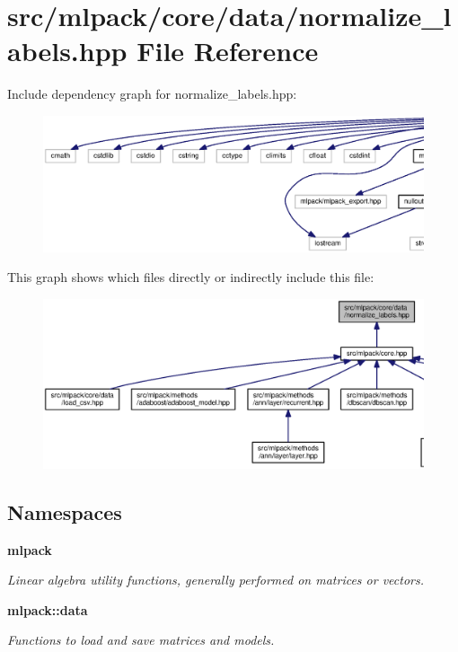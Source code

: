 \section{src/mlpack/core/data/normalize\+\_\+labels.hpp File Reference}
\label{normalize__labels_8hpp}
Include dependency graph for normalize\+\_\+labels.\+hpp\+:
\nopagebreak
\begin{figure}[H]
\begin{center}
\leavevmode
\includegraphics[width=350pt]{normalize__labels_8hpp__incl}
\end{center}
\end{figure}
This graph shows which files directly or indirectly include this file\+:
\nopagebreak
\begin{figure}[H]
\begin{center}
\leavevmode
\includegraphics[width=350pt]{normalize__labels_8hpp__dep__incl}
\end{center}
\end{figure}
\subsection*{Namespaces}
\begin{DoxyCompactItemize}
\item 
 {\bf mlpack}
\begin{DoxyCompactList}\small\item\em Linear algebra utility functions, generally performed on matrices or vectors. \end{DoxyCompactList}\item 
 {\bf mlpack\+::data}
\begin{DoxyCompactList}\small\item\em Functions to load and save matrices and models. \end{DoxyCompactList}\end{DoxyCompactItemize}
